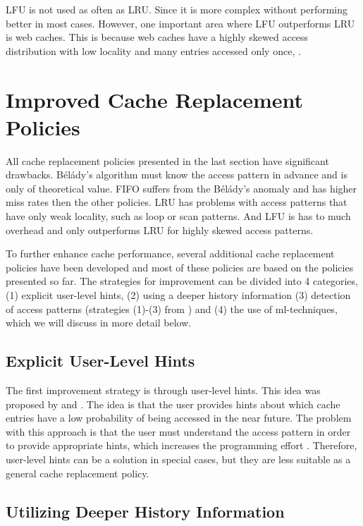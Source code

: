 \documentclass[
	12pt,
	a4paper,
	abstract,
	bibliography=totoc,
	chapterprefix,
	headings=openright,
	numbers=endperiod,
	parskip=half,
	twoside,
]{scrreprt}
\begin{document}
LFU is not used as often as LRU.
Since it is more complex without performing better in most cases.
However, one important area where LFU outperforms LRU is web caches.
This is because web caches have a highly skewed access distribution with low locality and  
many entries accessed only once, \cite{mahanti2000traffic}.

\section{Improved Cache Replacement Policies}

All cache replacement policies presented in the last section have significant drawbacks.
Bélády's algorithm must know the access pattern in advance and is only of theoretical value.
FIFO suffers from the Bélády's anomaly and has higher miss rates then the other policies.
LRU has problems with access patterns that have only weak locality, such as loop or scan patterns.
And LFU is has to much overhead and only outperforms LRU for highly skewed access patterns. 

To further enhance cache performance, several additional cache replacement policies have been developed and
most of these policies are based on the policies presented so far.
The strategies for improvement can be divided into 4 categories,
(1) explicit user-level hints, (2) using a deeper history information
(3) detection of access patterns (strategies (1)-(3) from \cite{10.1145/511399.511340})
and (4) the use of ml-techniques, which we will discuss in more detail below.

\subsection{Explicit User-Level Hints}

The first improvement strategy is through user-level hints.
This idea was proposed by \cite{cao1994application} and \cite{patterson1995informed}.
The idea is that the user provides hints about which cache entries have a low probability of being accessed in the near future.
The problem with this approach is that the user must understand the access pattern in order to provide appropriate hints, which increases the programming effort \cite{10.1145/511399.511340}.
Therefore, user-level hints can be a solution in special cases,
but they are less suitable as a general cache replacement policy.

\subsection{Utilizing Deeper History Information}
\end{document}
